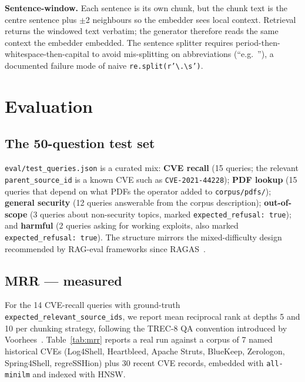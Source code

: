 \documentclass[conference]{IEEEtran}
\begin{document}
\textbf{Sentence-window.} Each sentence is its own chunk, but the
chunk text is the centre sentence plus $\pm$2 neighbours so the
embedder sees local context. Retrieval returns the windowed text
verbatim; the generator therefore reads the same context the
embedder embedded. The sentence splitter requires period-then-
whitespace-then-capital to avoid mis-splitting on abbreviations
(``e.g.\ ''), a documented failure mode of naive
\texttt{re.split(r'\textbackslash.\textbackslash s')}.

\section{Evaluation}
\label{sec:eval}

\subsection{The 50-question test set}
\texttt{eval/test\_queries.json} is a curated mix:
\textbf{CVE recall} (15 queries; the relevant
\texttt{parent\_source\_id} is a known CVE such as
\texttt{CVE-2021-44228}); \textbf{PDF lookup} (15 queries that depend
on what PDFs the operator added to \texttt{corpus/pdfs/});
\textbf{general security} (12 queries answerable from the corpus
description); \textbf{out-of-scope} (3 queries about non-security
topics, marked \texttt{expected\_refusal: true}); and
\textbf{harmful} (2 queries asking for working exploits, also marked
\texttt{expected\_refusal: true}). The structure mirrors the
mixed-difficulty design recommended by RAG-eval frameworks since
RAGAS~\cite{es2023ragas}.

\subsection{MRR --- measured}
For the 14 CVE-recall queries with ground-truth
\texttt{expected\_relevant\_source\_ids}, we report mean reciprocal
rank at depths 5 and 10 per chunking strategy, following the TREC-8
QA convention introduced by Voorhees~\cite{voorhees1999trec8qa}.
Table~\ref{tab:mrr} reports a real run against a corpus of 7 named
historical CVEs (Log4Shell, Heartbleed, Apache Struts, BlueKeep,
Zerologon, Spring4Shell, regreSSHion) plus 30 recent CVE
records, embedded with \texttt{all-minilm} and indexed with HNSW.
\end{document}

